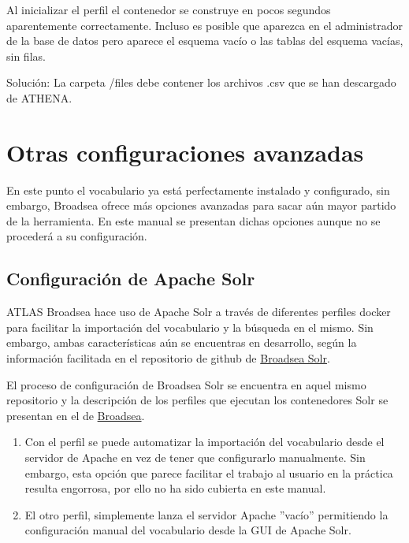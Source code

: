 Al inicializar el perfil  el contenedor se construye en pocos segundos aparentemente correctamente. Incluso es posible que aparezca en el administrador de la base de datos pero aparece el esquema vacío o las tablas del esquema vacías, sin filas.

Solución: La carpeta /files debe contener los archivos .csv que se han descargado de ATHENA.

\section{Otras configuraciones avanzadas}

En este punto el vocabulario ya está perfectamente instalado y configurado, sin embargo, Broadsea ofrece más opciones avanzadas para sacar aún mayor partido de la herramienta. En este manual se presentan dichas opciones aunque no se procederá a su configuración.

\subsection{Configuración de Apache Solr}

ATLAS Broadsea hace uso de Apache Solr a través de diferentes perfiles docker para facilitar la importación del vocabulario y la búsqueda en el mismo. Sin embargo, ambas características aún se encuentras en desarrollo, según la información facilitada en el repositorio de github de \href{https://github.com/OHDSI/Broadsea-Solr}{Broadsea Solr}.

El proceso de configuración de Broadsea Solr se encuentra en aquel mismo repositorio y la descripción de los perfiles que ejecutan los contenedores Solr se presentan en el de \href{https://github.com/OHDSI/Broadsea}{Broadsea}. 

\begin{enumerate}
    \item Con el perfil  se puede automatizar la importación del vocabulario desde el servidor de Apache en vez de tener que configurarlo manualmente. Sin embargo, esta opción que parece facilitar el trabajo al usuario en la práctica resulta engorrosa, por ello no ha sido cubierta en este manual.
    \item El otro perfil,  simplemente lanza el servidor Apache ''vacío'' permitiendo la configuración manual del vocabulario desde la GUI de Apache Solr.
\end{enumerate}


